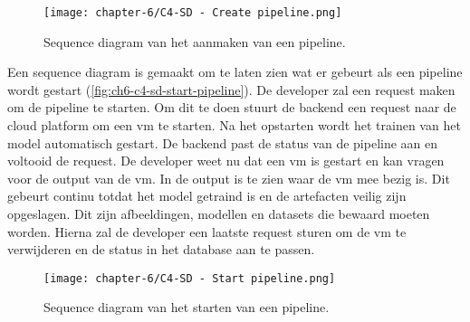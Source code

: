 \begin{figure}[hbt!]
  \centering
  \texttt{[image: chapter-6/C4-SD - Create pipeline.png]}
  \caption{Sequence diagram van het aanmaken van een pipeline.}
  \label{fig:ch6-c4-sd-create-pipeline}
\end{figure}

\newpage

Een sequence diagram is gemaakt om te laten zien wat er gebeurt als een pipeline wordt gestart (\autoref{fig:ch6-c4-sd-start-pipeline}). De developer zal een request maken om de pipeline te starten. Om dit te doen stuurt de backend een request naar de cloud platform om een \acrfull{vm} te starten. Na het opstarten wordt het trainen van het model automatisch gestart. De backend past de status van de pipeline aan en voltooid de request. De developer weet nu dat een \acrshort{vm} is gestart en kan vragen voor de output van de \acrshort{vm}. In de output is te zien waar de \acrshort{vm} mee bezig is. Dit gebeurt continu totdat het model getraind is en de artefacten veilig zijn opgeslagen. Dit zijn afbeeldingen, modellen en datasets die bewaard moeten worden. Hierna zal de developer een laatste request sturen om de \acrshort{vm} te verwijderen en de status in het database aan te passen. 

\begin{figure}[hbt!]
  \centering
  \texttt{[image: chapter-6/C4-SD - Start pipeline.png]}
  \caption{Sequence diagram van het starten van een pipeline.}
  \label{fig:ch6-c4-sd-start-pipeline}
\end{figure}

